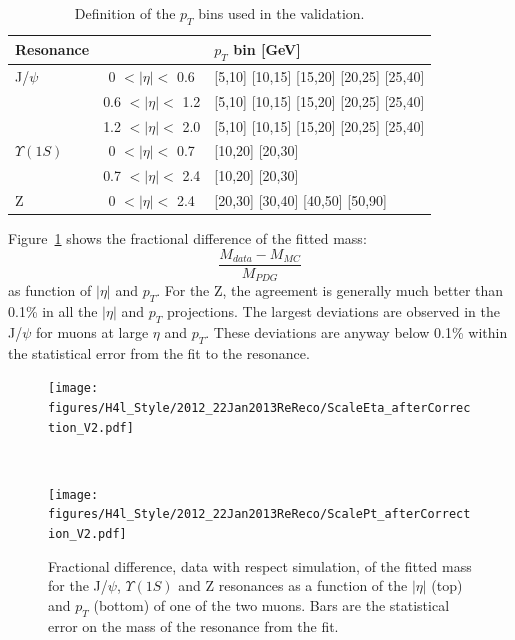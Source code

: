 \begin{table}[hbH]
\begin{center}
\caption{Definition of the $p_T$ bins used in the validation.\label{tab:pt_bins}}
\begin{tabular}{|l|cl|}
\hline
Resonance & & $p_T$ bin [GeV] \\
\hline
J/$\psi$      & 0   $<|\eta|<$ 0.6 & [5,10] [10,15] [15,20] [20,25] [25,40] \\
              & 0.6 $<|\eta|<$ 1.2 & [5,10] [10,15] [15,20] [20,25] [25,40] \\
              & 1.2 $<|\eta|<$ 2.0 & [5,10] [10,15] [15,20] [20,25] [25,40] \\
\hline                     
$\Upsilon(1S)$& 0   $<|\eta|<$ 0.7 & [10,20] [20,30] \\
              & 0.7 $<|\eta|<$ 2.4 & [10,20] [20,30] \\
\hline                     
Z             & 0   $<|\eta|<$ 2.4 & [20,30] [30,40] [40,50] [50,90] \\
\hline
\end{tabular}
\end{center}
\end{table}

Figure~\ref{fig:ScaleDATAMC_8TeV} shows the fractional difference of the fitted mass:
\[
\frac{M_{data}-M_{MC}}{M_{PDG}}
\]
as function of $|\eta|$ and  $p_T$. For the Z, the agreement is
generally much better than 0.1\% in all the $|\eta|$ and $p_T$ projections.
The largest deviations are observed in the J/$\psi$ for muons at large
$\eta$ and $p_T$. These deviations are anyway below 0.1\% within the
statistical error from the fit to the resonance.
\begin{figure}[hbtp]  
\begin{center}
\texttt{[image: figures/H4l\_Style/2012\_22Jan2013ReReco/ScaleEta\_afterCorrection\_V2.pdf]}
 \end{center}\\
\begin{center}
\texttt{[image: figures/H4l\_Style/2012\_22Jan2013ReReco/ScalePt\_afterCorrection\_V2.pdf]} 
 \end{center}
 \hspace{1cm} 
   \caption{Fractional difference, data with respect simulation, of the fitted mass for the J/$\psi$,
     $\Upsilon(1S)$ and Z resonances as a function of the $|\eta|$ (top)
     and $p_T$ (bottom) of one of the two muons. Bars are the
     statistical error on the mass of the resonance from the fit.
   \label{fig:ScaleDATAMC_8TeV}}
\end{figure} 

